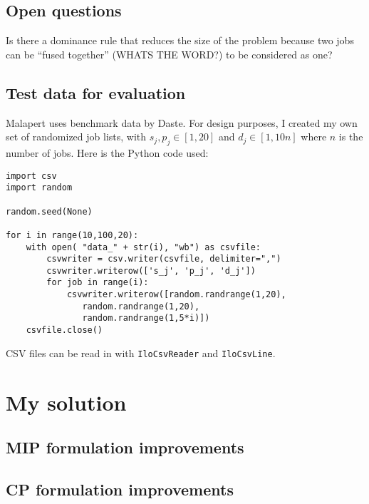 \documentclass[13pt, letterpaper, twoside]{book}
\begin{document}

\section{Open questions}
\begin{alist}
\item{Is there a dominance rule that reduces the size of the problem because two
jobs can be ``fused together'' (WHATS THE WORD?) to be considered as one?}
\end{alist}

\section{Test data for evaluation}
Malapert uses benchmark data by Daste. For design purposes, I created my own set of randomized job lists, with $s_j, p_j \in [1, 20]$ and $d_j \in [1, 10n]$ where $n$ is the number of jobs. Here is the Python code used:

\lstset{language=Python}
\begin{lstlisting}
import csv
import random

random.seed(None)

for i in range(10,100,20):
    with open( "data_" + str(i), "wb") as csvfile:
        csvwriter = csv.writer(csvfile, delimiter=",")
        csvwriter.writerow(['s_j', 'p_j', 'd_j'])
        for job in range(i):
            csvwriter.writerow([random.randrange(1,20),
               random.randrange(1,20),
               random.randrange(1,5*i)])
    csvfile.close()
\end{lstlisting}

CSV files can be read in with \texttt{IloCsvReader} and \texttt{IloCsvLine}.


\chapter{My solution}
\section{MIP formulation improvements}
\section{CP formulation improvements}
\end{document}
